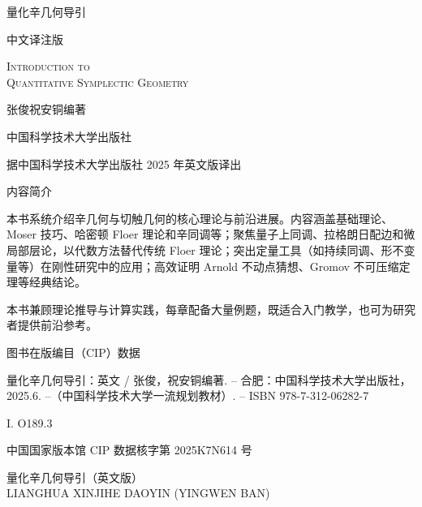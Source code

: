 \begin{titlepage}
  \centering
  \vspace*{2.2cm}
  {\heiti\fontsize{38}{46}\selectfont 量化辛几何导引\par}
  \vspace{0.5cm}
  {\heiti\Large 中文译注版\par}
  \vspace{1.6cm}
  {\large\scshape Introduction to\\[2pt] Quantitative Symplectic Geometry\par}
  \vspace{2.2cm}
  {\large 张俊\quad 祝安铜\quad 编著\par}
  \vfill
  {\large 中国科学技术大学出版社\par}
  \vspace{0.3cm}
  {\small 据中国科学技术大学出版社 2025 年英文版译出\par}
\end{titlepage}

\thispagestyle{empty}
\begin{center}
  {\heiti\large 内容简介}
\end{center}

\noindent
本书系统介绍辛几何与切触几何的核心理论与前沿进展。内容涵盖基础理论、Moser 技巧、哈密顿 Floer 理论和辛同调等；聚焦量子上同调、拉格朗日配边和微局部层论，以代数方法替代传统 Floer 理论；突出定量工具（如持续同调、形不变量等）在刚性研究中的应用；高效证明 Arnold 不动点猜想、Gromov 不可压缩定理等经典结论。

\medskip
\noindent
本书兼顾理论推导与计算实践，每章配备大量例题，既适合入门教学，也可为研究者提供前沿参考。

\vspace{2.2cm}
\noindent
{\heiti 图书在版编目（CIP）数据}

\noindent
量化辛几何导引：英文 / 张俊，祝安铜编著. -- 合肥：中国科学技术大学出版社，2025.6. --（中国科学技术大学一流规划教材）. -- ISBN 978-7-312-06282-7

\noindent
I. O189.3

\noindent
中国国家版本馆 CIP 数据核字第 2025K7N614 号

\vspace{1.6cm}
\noindent
{\heiti 量化辛几何导引（英文版）}\\
LIANGHUA XINJIHE DAOYIN (YINGWEN BAN)

